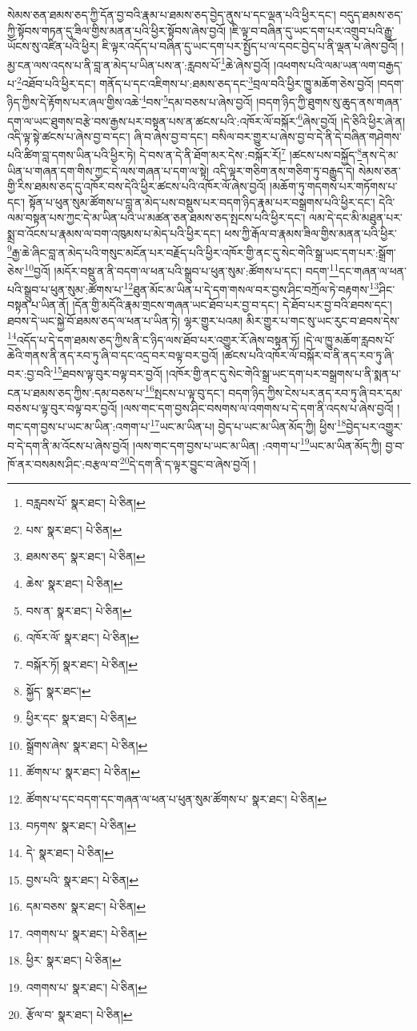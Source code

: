 སེམས་ཅན་ཐམས་ཅད་ཀྱི་དོན་བྱ་བའི་རྣམ་པ་ཐམས་ཅད་བྱེད་ནུས་པ་དང་ལྡན་པའི་ཕྱིར་དང་། བདུད་ཐམས་ཅད་ཀྱི་སྟོབས་གཏན་དུ་ཟིལ་གྱིས་མནན་པའི་ཕྱིར་སྟོབས་ཞེས་བྱའོ། །ཇི་ལྟ་བ་བཞིན་དུ་ཡང་དག་པར་འགྲུབ་པའི་རྒྱུ་ཡོངས་སུ་འཛིན་པའི་ཕྱིར། ཇི་ལྟར་འདོད་པ་བཞིན་དུ་ཡང་དག་པར་སྤྱོད་པ་ལ་དབང་བྱེད་པ་ནི་ལྡན་པ་ཞེས་བྱའོ། །མྱ་ངན་ལས་འདས་པ་ནི་བླ་ན་མེད་པ་ཡིན་པས་ན་:རླབས་པོ་\footnote{བརླབས་པོ་  སྣར་ཐང་།  པེ་ཅིན། }ཆེ་ཞེས་བྱའོ། །འཕགས་པའི་ལམ་ཡན་ལག་བརྒྱད་པ་\footnote{པས་  སྣར་ཐང་།  པེ་ཅིན། }འཐོབ་པའི་ཕྱིར་དང་། གནོད་པ་དང་འཇིགས་པ་:ཐམས་ཅད་དང་\footnote{ཐམས་ཅད་  སྣར་ཐང་།  པེ་ཅིན། }བྲལ་བའི་ཕྱིར་ཁྱུ་མཆོག་ཅེས་བྱའོ། །བདག་ཉིད་ཀྱིས་དེ་རྟོགས་པར་ཞལ་གྱིས་འཆེ་\footnote{ཆེས་  སྣར་ཐང་།  པེ་ཅིན། }བས་\footnote{བས་ན་  སྣར་ཐང་།  པེ་ཅིན། }དམ་བཅས་པ་ཞེས་བྱའོ། །བདག་ཉིད་ཀྱི་ཐུགས་སུ་ཆུད་ནས་གཞན་དག་ལ་ཡང་ཐུགས་བརྩེ་བས་རྒྱས་པར་བསྟན་པས་ན་ཚངས་པའི་:འཁོར་ལོ་བསྐོར་\footnote{འཁོར་ལོ་  སྣར་ཐང་།  པེ་ཅིན། }ཞེས་བྱའོ། །དེ་ཅིའི་ཕྱིར་ཞེ་ན། འདི་ལྟ་སྟེ་ཚངས་པ་ཞེས་བྱ་བ་དང་། ཞི་བ་ཞེས་བྱ་བ་དང་། བསིལ་བར་གྱུར་པ་ཞེས་བྱ་བ་དེ་ནི་དེ་བཞིན་གཤེགས་པའི་ཚིག་བླ་དགས་ཡིན་པའི་ཕྱིར་ཏེ། དེ་བས་ན་དེ་ནི་ཐོག་མར་དེས་:བསྐོར་རོ།\footnote{བསྐོར་ཏོ།  སྣར་ཐང་།  པེ་ཅིན། } །ཚངས་པས་བསྐྱོད་\footnote{སྐྱོད་  སྣར་ཐང་། }ནས་དེ་མ་ཡིན་པ་གཞན་དག་གིས་ཀྱང་དེ་ལས་གཞན་པ་དག་ལ་སྟེ། འདི་ལྟར་གཅིག་ནས་གཅིག་ཏུ་བརྒྱུད་དེ། སེམས་ཅན་གྱི་རིས་ཐམས་ཅད་དུ་འཁོར་བས་དེའི་ཕྱིར་ཚངས་པའི་འཁོར་ལོ་ཞེས་བྱའོ། །མཆོག་ཏུ་གདགས་པར་གཏོགས་པ་དང་། སྟོན་པ་ཕུན་སུམ་ཚོགས་པ་བླ་ན་མེད་པས་བསྡུས་པར་བདག་ཉིད་རྣམ་པར་བསྒྲགས་པའི་ཕྱིར་དང་། དེའི་ལམ་བསྟན་པས་ཀྱང་དེ་མ་ཡིན་པའི་ཡ་མཚན་ཅན་ཐམས་ཅད་སྤངས་པའི་ཕྱིར་དང་། ལམ་དེ་དང་མི་མཐུན་པར་སྨྲ་བ་འོངས་པ་རྣམས་ལ་བག་འཁུམས་པ་མེད་པའི་ཕྱིར་དང་། ཕས་ཀྱི་རྒོལ་བ་རྣམས་ཟིལ་གྱིས་མནན་པའི་ཕྱིར་\footnote{ཕྱིར་དང་  སྣར་ཐང་།  པེ་ཅིན། }རྒྱ་ཆེ་ཞིང་བླ་ན་མེད་པའི་གསུང་མངོན་པར་བརྗོད་པའི་ཕྱིར་འཁོར་གྱི་ནང་དུ་སེང་གེའི་སྒྲ་ཡང་དག་པར་:སྒྲོག་ཅེས་\footnote{སྒྲོགས་ཞེས་  སྣར་ཐང་།  པེ་ཅིན། }བྱའོ། །མདོར་བསྡུ་ན་ནི་བདག་ལ་ཕན་པའི་སྒྲུབ་པ་ཕུན་སུམ་:ཚོགས་པ་དང་། བདག་\footnote{ཚོགས་པ་  སྣར་ཐང་།  པེ་ཅིན། }དང་གཞན་ལ་ཕན་པའི་སྒྲུབ་པ་ཕུན་སུམ་:ཚོགས་པ་\footnote{ཚོགས་པ་དང་བདག་དང་གཞན་ལ་ཕན་པ་ཕུན་སུམ་ཚོགས་པ་  སྣར་ཐང་།  པེ་ཅིན། }ཐུན་མོང་མ་ཡིན་པ་དེ་དག་གསལ་བར་བྱས་ཤིང་བཀྲོལ་ཏེ་བརྟགས་\footnote{བཏགས་  སྣར་ཐང་།  པེ་ཅིན། }ཤིང་བསྟན་པ་ཡིན་ནོ། །དོན་གྱི་མདོའི་རྣམ་གྲངས་གཞན་ཡང་ཐོབ་པར་བྱ་བ་དང་། དེ་ཐོབ་པར་བྱ་བའི་ཐབས་དང་། ཐབས་དེ་ཡང་སྐྱེ་བོ་ཐམས་ཅད་ལ་ཕན་པ་ཡིན་ཏེ། ལྷར་གྱུར་པའམ། མིར་གྱུར་པ་གང་སུ་ཡང་རུང་བ་ཐབས་དེས་\footnote{དེ་  སྣར་ཐང་།  པེ་ཅིན། }འདོད་པ་དེ་དག་ཐམས་ཅད་ཀྱིས་ནི་ང་ཉིད་ལས་ཐོབ་པར་འགྱུར་རོ་ཞེས་བསྟན་ཏོ། །དེ་ལ་ཁྱུ་མཆོག་རླབས་པོ་ཆེའི་གནས་ནི་ནད་རབ་ཏུ་ཞི་བ་དང་འདྲ་བར་བལྟ་བར་བྱའོ། །ཚངས་པའི་འཁོར་ལོ་བསྐོར་བ་ནི་ནད་རབ་ཏུ་ཞི་བར་:བྱ་བའི་\footnote{བྱས་པའི་  སྣར་ཐང་།  པེ་ཅིན། }ཐབས་ལྟ་བུར་བལྟ་བར་བྱའོ། །འཁོར་གྱི་ནང་དུ་སེང་གེའི་སྒྲ་ཡང་དག་པར་བསྒྲགས་པ་ནི་སྨན་པ་ངན་པ་ཐམས་ཅད་ཀྱིས་:དམ་བཅས་པ་\footnote{དམ་བཅས་  སྣར་ཐང་།  པེ་ཅིན། }སྤངས་པ་ལྟ་བུ་དང་། བདག་ཉིད་ཀྱིས་ངེས་པར་ནད་རབ་ཏུ་ཞི་བར་དམ་བཅས་པ་ལྟ་བུར་བལྟ་བར་བྱའོ། །ལས་གང་དག་བྱས་ཤིང་བསགས་ལ་འགགས་པ་དེ་དག་ནི་འདས་པ་ཞེས་བྱའོ། །གང་དག་བྱས་པ་ཡང་མ་ཡིན་:འགག་པ་\footnote{འགགས་པ་  སྣར་ཐང་།  པེ་ཅིན། }ཡང་མ་ཡིན་པ། བྱེད་པ་ཡང་མ་ཡིན་མོད་ཀྱི། ཕྱིས་\footnote{ཕྱིར་  སྣར་ཐང་།  པེ་ཅིན། }བྱེད་པར་འགྱུར་བ་དེ་དག་ནི་མ་འོངས་པ་ཞེས་བྱའོ། །ལས་གང་དག་བྱས་པ་ཡང་མ་ཡིན། :འགག་པ་\footnote{འགགས་པ་  སྣར་ཐང་།  པེ་ཅིན། }ཡང་མ་ཡིན་མོད་ཀྱི། བྱ་བ་ཁོ་ནར་བསམས་ཤིང་:བརྩལ་བ་\footnote{རྩོལ་བ་  སྣར་ཐང་།  པེ་ཅིན། }དེ་དག་ནི་ད་ལྟར་བྱུང་བ་ཞེས་བྱའོ། །
